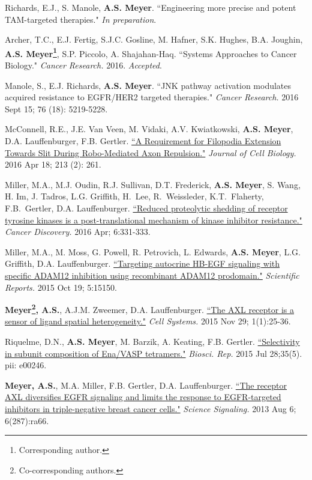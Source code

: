\documentclass[11pt]{res}
\begin{document}
\begin{resume}
{Richards, E.J., S. Manole, {\bf A.S. Meyer}. ``Engineering more precise and potent TAM-targeted therapies." {\sl In preparation}.

\parskip 0.1in

Archer, T.C., E.J. Fertig, S.J.C. Gosline, M. Hafner, S.K. Hughes, B.A. Joughin, {\bf A.S. Meyer\footnote{Corresponding author.}}, S.P. Piccolo, A. Shajahan-Haq. ``Systems Approaches to Cancer Biology." {\sl Cancer Research.} 2016. {\sl Accepted}.

Manole, S., E.J. Richards, {\bf A.S. Meyer}. ``JNK pathway activation modulates acquired resistance to EGFR/HER2 targeted therapies." {\sl Cancer Research.} 2016 Sept 15; 76 (18): 5219-5228.

McConnell, R.E., J.E. Van Veen, M. Vidaki, A.V. Kwiatkowski, {\bf A.S. Meyer}, D.A. Lauffenburger, F.B. Gertler. \href{http://jcb.rupress.org/content/213/2/261.full}{``A Requirement for Filopodia Extension Towards Slit During Robo-Mediated Axon Repulsion."} {\sl Journal of Cell Biology.} 2016 Apr 18; 213 (2): 261.

Miller, M.A., M.J. Oudin, R.J. Sullivan, D.T. Frederick, {\bf A.S. Meyer}, S. Wang, H. Im, J. Tadros, L.G. Griffith, H. Lee, R. Weissleder, K.T. Flaherty, F.B. Gertler, D.A. Lauffenburger. \href{http://cancerdiscovery.aacrjournals.org/content/early/2016/03/15/2159-8290.CD-15-0933}{``Reduced proteolytic shedding of receptor tyrosine kinases is a post-translational mechanism of kinase inhibitor resistance."} {\sl Cancer Discovery.}  2016 Apr; 6:331-333.

Miller, M.A., M. Moss, G. Powell, R. Petrovich, L. Edwards, {\bf A.S. Meyer}, L.G. Griffith, D.A. Lauffenburger. \href{http://www.ncbi.nlm.nih.gov/pubmed/26477568}{``Targeting autocrine HB-EGF signaling with specific ADAM12 inhibition using recombinant ADAM12 prodomain."} {\sl Scientific Reports.} 2015 Oct 19; 5:15150.

{\bf Meyer\footnote{Co-corresponding authors.}, A.S.}, A.J.M. Zweemer, D.A. Lauffenburger\footnotemark[\value{footnote}]. \href{http://www.cell.com/cell-systems/abstract/S2405-4712(15)00007-1}{``The AXL receptor is a sensor of ligand spatial heterogeneity."} {\sl Cell Systems.} 2015 Nov 29; 1(1):25-36.

Riquelme, D.N., {\bf A.S. Meyer}, M. Barzik, A. Keating, F.B. Gertler. \href{http://www.ncbi.nlm.nih.gov/pubmed/26221026}{``Selectivity in subunit composition of Ena/VASP tetramers."} {\sl Biosci. Rep.} 2015 Jul 28;35(5). pii: e00246.

{\bf Meyer, A.S.}, M.A. Miller, F.B. Gertler, D.A. Lauffenburger. \href{http://www.ncbi.nlm.nih.gov/pubmed/23921085}{``The receptor AXL diversifies EGFR signaling and limits the response to EGFR-targeted inhibitors in triple-negative breast cancer cells."} {\sl Science Signaling.} 2013 Aug 6; 6(287):ra66.

}
\end{resume}
\end{document}
